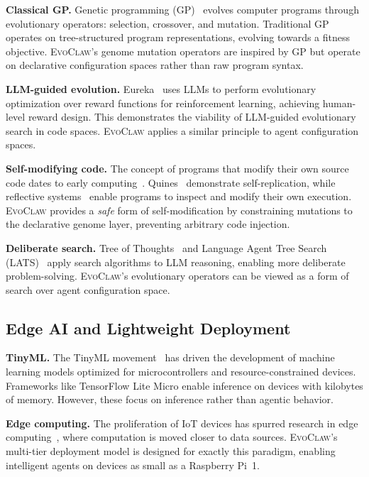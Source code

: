 \documentclass{article}
\newcommand{\evoclaw}{\textsc{EvoClaw}}
\begin{document}
\textbf{Classical GP.} Genetic programming (GP)~\cite{koza1992gp} evolves computer programs through evolutionary operators: selection, crossover, and mutation. Traditional GP operates on tree-structured program representations, evolving towards a fitness objective. \evoclaw{}'s genome mutation operators are inspired by GP but operate on declarative configuration spaces rather than raw program syntax.

\textbf{LLM-guided evolution.} Eureka~\cite{ma2023eureka} uses LLMs to perform evolutionary optimization over reward functions for reinforcement learning, achieving human-level reward design. This demonstrates the viability of LLM-guided evolutionary search in code spaces. \evoclaw{} applies a similar principle to agent configuration spaces.

\textbf{Self-modifying code.} The concept of programs that modify their own source code dates to early computing~\cite{vonneumann1966self}. Quines~\cite{quine_thompson} demonstrate self-replication, while reflective systems~\cite{smith1984reflection} enable programs to inspect and modify their own execution. \evoclaw{} provides a \textit{safe} form of self-modification by constraining mutations to the declarative genome layer, preventing arbitrary code injection.

\textbf{Deliberate search.} Tree of Thoughts~\cite{yao2023tree} and Language Agent Tree Search (LATS)~\cite{zhou2023lats} apply search algorithms to LLM reasoning, enabling more deliberate problem-solving. \evoclaw{}'s evolutionary operators can be viewed as a form of search over agent configuration space.


\subsection{Edge AI and Lightweight Deployment}

\textbf{TinyML.} The TinyML movement~\cite{tinyml} has driven the development of machine learning models optimized for microcontrollers and resource-constrained devices. Frameworks like TensorFlow Lite Micro enable inference on devices with kilobytes of memory. However, these focus on inference rather than agentic behavior.

\textbf{Edge computing.} The proliferation of IoT devices has spurred research in edge computing~\cite{shi2016edge}, where computation is moved closer to data sources. \evoclaw{}'s multi-tier deployment model is designed for exactly this paradigm, enabling intelligent agents on devices as small as a Raspberry Pi~1.
\end{document}
